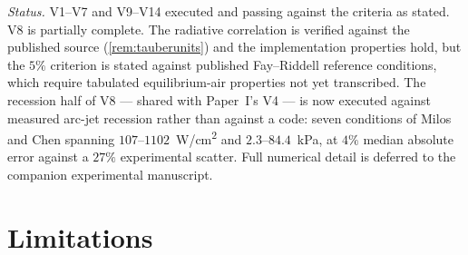 \documentclass[11pt,a4paper]{article}
\theoremstyle{definition}
\numberwithin{equation}{section}
\begin{document}
\emph{Status.} V1--V7 and V9--V14 executed and passing against the criteria as stated. V8 is partially complete. The radiative correlation is verified against the published source (\cref{rem:tauberunits}) and the implementation properties hold, but the $5\%$ criterion is stated against published Fay--Riddell reference conditions, which require tabulated equilibrium-air properties not yet transcribed. The recession half of V8 --- shared with Paper~I's V4 --- is now executed against measured arc-jet recession rather than against a code: seven conditions of Milos and Chen \cite{milos2010} spanning $107$--$1102$~W/cm\textsuperscript{2} and $2.3$--$84.4$~kPa, at $4\%$ median absolute error against a $27\%$ experimental scatter. Full numerical detail is deferred to the companion experimental manuscript.

\section{Limitations}
\label{sec:limitations}
\end{document}
